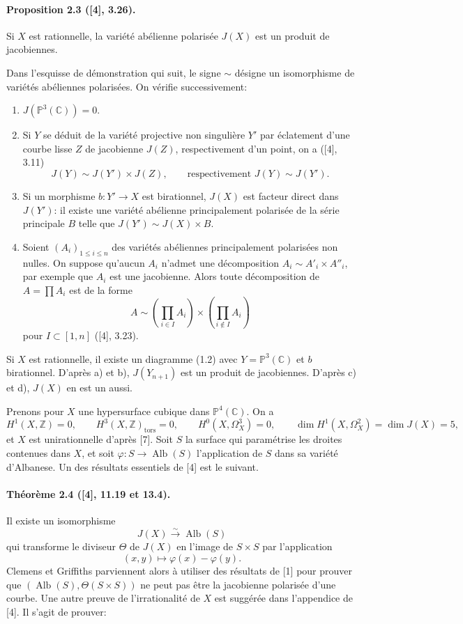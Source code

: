 \documentclass[10pt]{article}
\newcommand{\C}{\mathbb C}
\newcommand{\Pj}{\mathbb P}
\newcommand{\Z}{\mathbb Z}
\newcommand{\Alb}{\operatorname{Alb}}
\newcommand{\tors}{\operatorname{tors}}
\newcommand{\iso}{\xrightarrow{\sim}}
\begin{document}
\paragraph{Proposition 2.3 ([4], 3.26).} Si \(X\) est rationnelle, la variété abélienne polarisée \(J(X)\) est un produit de jacobiennes.

Dans l'esquisse de démonstration qui suit, le signe \(\sim\) désigne un isomorphisme de variétés abéliennes polarisées. On vérifie successivement:
\begin{enumerate}[label=\alph*)]
\item \(J(\Pj^3(\C))=0\).
\item Si \(Y\) se déduit de la variété projective non singulière \(Y'\) par éclatement d'une courbe lisse \(Z\) de jacobienne \(J(Z)\), respectivement d'un point, on a ([4], 3.11)
\[
J(Y)\sim J(Y')\times J(Z),\qquad\text{respectivement }J(Y)\sim J(Y').
\]
\item Si un morphisme \(b:Y'\to X\) est birationnel, \(J(X)\) est facteur direct dans \(J(Y')\): il existe une variété abélienne principalement polarisée de la série principale \(B\) telle que \(J(Y')\sim J(X)\times B\).
\item Soient \((A_i)_{1\le i\le n}\) des variétés abéliennes principalement polarisées non nulles. On suppose qu'aucun \(A_i\) n'admet une décomposition \(A_i\sim A'_i\times A''_i\), par exemple que \(A_i\) est une jacobienne. Alors toute décomposition de \(A=\prod A_i\) est de la forme
\[
A\sim \left(\prod_{i\in I}A_i\right)\times\left(\prod_{i\notin I}A_i\right)
\]
pour \(I\subset[1,n]\) ([4], 3.23).
\end{enumerate}
Si \(X\) est rationnelle, il existe un diagramme (1.2) avec \(Y=\Pj^3(\C)\) et \(b\) birationnel. D'après a) et b), \(J(Y_{n+1})\) est un produit de jacobiennes. D'après c) et d), \(J(X)\) en est un aussi.

Prenons pour \(X\) une hypersurface cubique dans \(\Pj^4(\C)\). On a
\[
H^1(X,\Z)=0,
\qquad H^3(X,\Z)_{\tors}=0,
\qquad H^0(X,\Omega_X^3)=0,
\qquad \dim H^1(X,\Omega_X^2)=\dim J(X)=5,
\]
et \(X\) est unirationnelle d'après [7]. Soit \(S\) la surface qui paramétrise les droites contenues dans \(X\), et soit \(\varphi:S\to\Alb(S)\) l'application de \(S\) dans sa variété d'Albanese. Un des résultats essentiels de [4] est le suivant.

\paragraph{Théorème 2.4 ([4], 11.19 et 13.4).} Il existe un isomorphisme
\[
J(X)\iso \Alb(S)
\]
qui transforme le diviseur \(\Theta\) de \(J(X)\) en l'image de \(S\times S\) par l'application
\[
(x,y)\longmapsto \varphi(x)-\varphi(y).
\]
Clemens et Griffiths parviennent alors à utiliser des résultats de [1] pour prouver que \((\Alb(S),\Theta(S\times S))\) ne peut pas être la jacobienne polarisée d'une courbe. Une autre preuve de l'irrationalité de \(X\) est suggérée dans l'appendice de [4]. Il s'agit de prouver:
\end{document}
